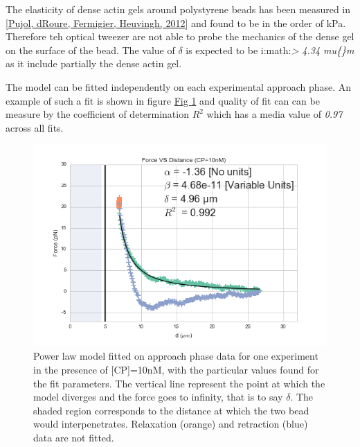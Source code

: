 \documentclass[A4paperpaper,11pt,english]{sphinxmanual}
\begin{document}
The elasticity of dense actin gels around polystyrene beads has been measured
in {\hyperref[parts/part3:pujol2012]{{[}Pujol, dRoure, Fermigier, Heuvingh,  2012{]}}} and found to be in the order of kPa.  Therefore teh
optical tweezer are not able to probe the mechanics of the dense gel on the
surface of the bead. The value of \(\delta\)  is expected to be i:math:\emph{\textgreater{} 4.34 mu\{\}m} as it include partially the dense actin gel.

The model can be fitted independently on each experimental
approach phase. An example of such a fit is shown in figure
\hyperref[parts/part3:force-distance-fit]{Fig  \ref*{parts/part3:force-distance-fit}} and quality of fit can can be measure by the
coefficient of determination \(R^2\) which has a media value of \emph{0.97}
across all fits.
\begin{figure}[htbp]
\centering
\capstart

\includegraphics[width=1.000\linewidth]{force-distance-fit.png}
\caption{Power law model fitted on approach phase data for one experiment in the
presence of {[}CP{]}=10nM, with the particular values found for the fit
parameters.  The vertical line represent the point at which the model
diverges and the force goes to infinity, that is to say \(\delta\). The
shaded region corresponds to the distance at which the two bead would
interpenetrates. Relaxation (orange) and retraction (blue) data are not fitted.}\label{parts/part3:force-distance-fit}\end{figure}
\end{document}
